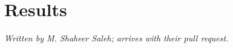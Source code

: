 \section{Results}
\label{sec:results}

\emph{Written by M. Shaheer Saleh; arrives with their pull request.}
